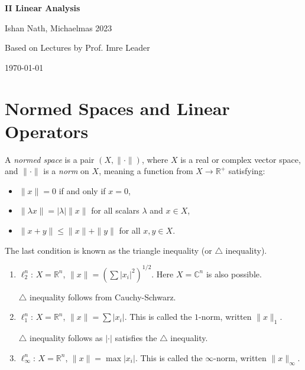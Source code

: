 \documentclass[12pt]{article}
\begin{document}
\hypersetup{pageanchor=false}
\begin{titlepage}
	\begin{center}
		\vspace*{1em}
		\Huge
		\textbf{II Linear Analysis}

		\vspace{1em}
		\large
		Ishan Nath, Michaelmas 2023

		\vspace{1.5em}

		\Large

		Based on Lectures by Prof. Imre Leader

		\vspace{1em}

		\large
		\today
	\end{center}
	
\end{titlepage}
\hypersetup{pageanchor=true}

\tableofcontents

\newpage

\section{Normed Spaces and Linear Operators}
\label{sec:normed_spaces_linear_operators}

A \emph{normed space} is a pair $(X, \|\cdot\|)$, where $X$ is a real or complex vector space, and $\|\cdot\|$ is a \emph{norm} on $X$, meaning a function from $X \to \mathbb{R}^{+}$ satisfying:
\begin{itemize}
	\item $\|x\| = 0$ if and only if $x = 0$,
	\item $\|\lambda x\| = |\lambda| \|x\|$ for all scalars $\lambda$ and $x \in X$,
	\item $\|x + y\| \le \|x\| + \|y\|$ for all $x, y \in X$.
\end{itemize}
The last condition is known as the triangle inequality (or $\triangle$ inequality).

\begin{exbox}
	\begin{enumerate}
		\item $\ell_2^n$: $X = \mathbb{R}^{n}$, $\|x\| = (\sum |x_i|^2)^{1/2}$. Here $X = \mathbb{C}^{n}$ is also possible.

			$\triangle$ inequality follows from Cauchy-Schwarz.
		\item $\ell_1^{n}$: $X = \mathbb{R}^{n}$, $\|x\| = \sum |x_i|$. This is called the $1$-norm, written $\|x\|_1$.

			$\triangle$ inequality follows as $|\cdot|$ satisfies the $\triangle$ inequality.
		\item $\ell_{\infty}^{n}$: $X = \mathbb{R}^{n}$, $\|x\| = \max |x_i|$. This is called the $\infty$-norm, written $\|x\|_\infty$.
	\end{enumerate}
\end{exbox}
\end{document}
